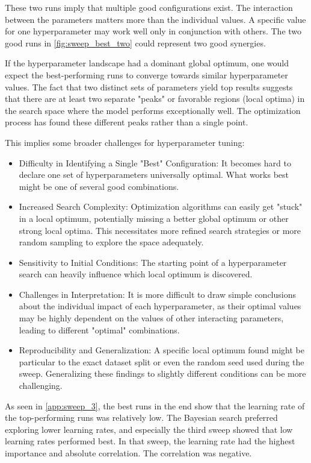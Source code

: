 These two runs imply that multiple good configurations exist. The interaction between the parameters matters more than the individual values. A specific value for one hyperparameter may work well only in conjunction with others. The two good runs in \autoref{fig:sweep_best_two} could represent two good synergies. 

If the hyperparameter landscape had a dominant global optimum, one would expect the best-performing runs to converge towards similar hyperparameter values. The fact that two distinct sets of parameters yield top results suggests that there are at least two separate "peaks" or favorable regions (local optima) in the search space where the model performs exceptionally well. The optimization process has found these different peaks rather than a single point.

This implies some broader challenges for hyperparameter tuning:

\begin{itemize}
    \item Difficulty in Identifying a Single "Best" Configuration: It becomes hard to declare one set of hyperparameters universally optimal. What works best might be one of several good combinations.
    \item Increased Search Complexity: Optimization algorithms can easily get "stuck" in a local optimum, potentially missing a better global optimum or other strong local optima. This necessitates more refined search strategies or more random sampling to explore the space adequately.
    \item Sensitivity to Initial Conditions: The starting point of a hyperparameter search can heavily influence which local optimum is discovered.
    \item Challenges in Interpretation: It is more difficult to draw simple conclusions about the individual impact of each hyperparameter, as their optimal values may be highly dependent on the values of other interacting parameters, leading to different "optimal" combinations.
    \item Reproducibility and Generalization: A specific local optimum found might be particular to the exact dataset split or even the random seed used during the sweep. Generalizing these findings to slightly different conditions can be more challenging.
\end{itemize}

As seen in \autoref{app:sweep_3}, the best runs in the end show that the learning rate of the top-performing runs was relatively low. The Bayesian search preferred exploring lower learning rates, and especially the third sweep showed that low learning rates performed best. In that sweep, the learning rate had the highest importance and absolute correlation. The correlation was negative. 

